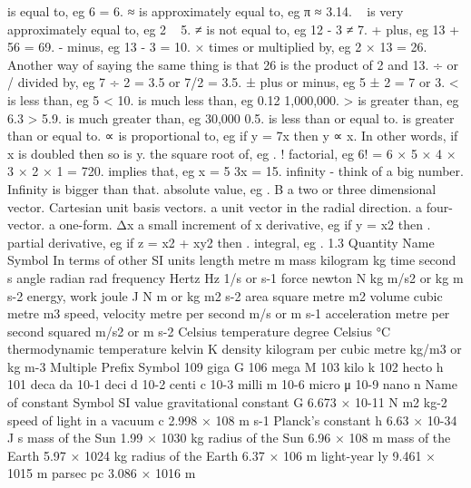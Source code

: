 

 is equal to, eg 6 = 6. ≈ is approximately equal to, eg π ≈ 3.14. ~ is very approximately equal to, eg 2 ~ 5. ≠ is not equal to, eg 12 - 3 ≠ 7. + plus, eg 13 + 56 = 69. - minus, eg 13 - 3 = 10. × times or multiplied by, eg 2 × 13 = 26. Another way of saying the same thing is that 26 is the product of 2 and 13. ÷ or / divided by, eg 7 ÷ 2 = 3.5 or 7/2 = 3.5. ± plus or minus, eg 5 ± 2 = 7 or 3. < is less than, eg 5 < 10. is much less than, eg 0.12 1,000,000. > is greater than, eg 6.3 > 5.9. is much greater than, eg 30,000 0.5. is less than or equal to. is greater than or equal to. ∝ is proportional to, eg if y = 7x then y ∝ x. In other words, if x is doubled then so is y. the square root of, eg . ! factorial, eg 6! = 6 × 5 × 4 × 3 × 2 × 1 = 720. implies that, eg x = 5 3x = 15. infinity - think of a big number. Infinity is bigger than that. absolute value, eg . B a two or three dimensional vector. Cartesian unit basis vectors. a unit vector in the radial direction. a four-vector. a one-form. Δx a small increment of x derivative, eg if y = x2 then . partial derivative, eg if z = x2 + xy2 then . integral, eg . 1.3
Quantity Name Symbol In terms of other SI units length metre m mass kilogram kg time second s angle radian rad frequency Hertz Hz 1/s or s-1 force newton N kg m/s2 or kg m s-2 energy, work joule J N m or kg m2 s-2 area square metre m2 volume cubic metre m3 speed, velocity metre per second m/s or m s-1 acceleration metre per second squared m/s2 or m s-2 Celsius temperature degree Celsius °C thermodynamic temperature kelvin K density kilogram per cubic metre kg/m3 or kg m-3
Multiple Prefix Symbol 109 giga G 106 mega M 103 kilo k 102 hecto h 101 deca da 10-1 deci d 10-2 centi c 10-3 milli m 10-6 micro μ 10-9 nano n
Name of constant Symbol SI value gravitational constant G 6.673 × 10-11 N m2 kg-2 speed of light in a vacuum c 2.998 × 108 m s-1 Planck's constant h 6.63 × 10-34 J s mass of the Sun 1.99 × 1030 kg radius of the Sun 6.96 × 108 m mass of the Earth 5.97 × 1024 kg radius of the Earth 6.37 × 106 m light-year ly 9.461 × 1015 m parsec pc 3.086 × 1016 m
